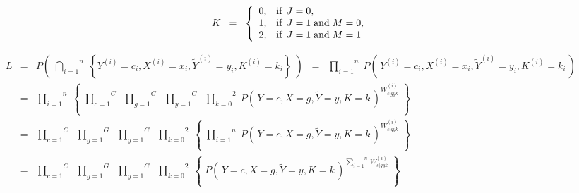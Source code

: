 \vskip 0.3cm
\begin{equation*}
K \;\;=\;\;
	\left\{\begin{array}{cl}
	0, & \textnormal{if}\;\, J = 0,
	\\
	1, & \textnormal{if}\;\, J = 1 \;\textnormal{and}\; M = 0,
	\\
	2, & \textnormal{if}\;\, J = 1 \;\textnormal{and}\; M = 1
	\end{array}\right.
\end{equation*}

\vskip 0.3cm
\begin{eqnarray*}
L &=&
	P\!\left(\;
		\overset{n}{\underset{i=1}{\bigcap}}\;
		\left\{
			Y^{(i)}=c_{i},X^{(i)}=x_{i},\widetilde{Y}^{(i)}=y_{i},K^{(i)}=k_{i}
		\right\}
	\;\right)
\;\;=\;\;
	\overset{n}{\underset{i=1}{\prod}} \;
	P\!\left(\,Y^{(i)}=c_{i},X^{(i)}=x_{i},\widetilde{Y}^{(i)}=y_{i},K^{(i)}=k_{i}\,\right)
\\
&=&
	\overset{n}{\underset{i=1}{\prod}} \;
	\left\{\;
		\overset{C}{\underset{c=1}{\prod}}\;\;
		\overset{G}{\underset{g=1}{\prod}}\;\;
		\overset{C}{\underset{y=1}{\prod}}\;\;
		\overset{2}{\underset{k=0}{\prod}}\;
		P\!\left(\,Y=c,X=g,\widetilde{Y}=y,K=k\,\right)^{W^{(i)}_{c \vert gyk}}
	\;\right\}
\\
&=&
	\overset{C}{\underset{c=1}{\prod}}\;\;
	\overset{G}{\underset{g=1}{\prod}}\;\;
	\overset{C}{\underset{y=1}{\prod}}\;\;
	\overset{2}{\underset{k=0}{\prod}}\;
	\left\{\;
		\overset{n}{\underset{i=1}{\prod}} \;
		P\!\left(\,Y=c,X=g,\widetilde{Y}=y,K=k\,\right)^{W^{(i)}_{c \vert gyk}}
	\;\right\}
\\
&=&
	\overset{C}{\underset{c=1}{\prod}}\;\;
	\overset{G}{\underset{g=1}{\prod}}\;\;
	\overset{C}{\underset{y=1}{\prod}}\;\;
	\overset{2}{\underset{k=0}{\prod}}\;
	\left\{\;
		P\!\left(\,Y=c,X=g,\widetilde{Y}=y,K=k\,\right)
		^{\overset{n}{\underset{i=1}{\sum}}\,W^{(i)}_{c \vert gyk}}
	\;\right\}
\end{eqnarray*}

